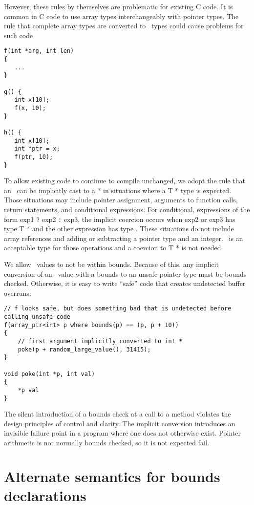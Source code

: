 However, these rules by themselves are problematic for existing C code.
It is common in C code to use array types interchangeably with pointer
types. The rule that complete array types are converted to
\arrayptr\ types could cause problems for such code

\begin{verbatim}
f(int *arg, int len)
{ 
   ...
}

g() {
   int x[10];
   f(x, 10);
}

h() {
   int x[10];
   int *ptr = x;
   f(ptr, 10);
}
\end{verbatim}

To allow existing code to continue to compile unchanged, we adopt the
rule that an \arrayptrT\ can be
implicitly cast to a  * in situations where a T * type is
expected. Those situations may include pointer assignment, arguments to
function calls, return statements, and conditional expressions. For
conditional, expressions of the form exp1 \texttt{?} exp2 \texttt{:}
exp3, the implicit coercion occurs when exp2 or exp3 has type T * and
the other expression has type
\arrayptrT. These situations do not
include array references and adding or subtracting a pointer type and an
integer. \arrayptrT\ is an acceptable
type for those operations and a coercion to T * is not needed.

We allow \arrayptr\ values to not be within bounds. Because of
this, any implicit conversion of an \arrayptr\ value with a
bounds to an unsafe pointer type must be bounds checked. Otherwise, it
is easy to write ``safe'' code that creates undetected buffer overruns:

\begin{verbatim}
// f looks safe, but does something bad that is undetected before calling unsafe code
f(array_ptr<int> p where bounds(p) == (p, p + 10))
{
    // first argument implicitly converted to int *
    poke(p + random_large_value(), 31415);  
}

void poke(int *p, int val)
{
    *p val
}
\end{verbatim}

The silent introduction of a bounds check at a call to a method violates
the design principles of control and clarity. The implicit conversion
introduces an invisible failure point in a program where one does not
otherwise exist. Pointer arithmetic is not normally bounds checked, so
it is not expected fail.

\section{Alternate semantics for bounds declarations}
\label{section:bounds-declarations-alternate-semantics}

